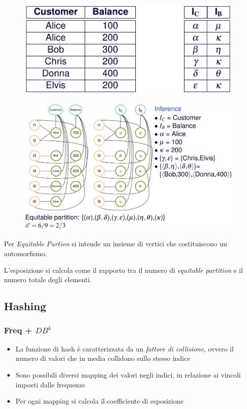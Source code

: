\documentclass{report}
\begin{document}
\begin{figure}[ht]
    \centering
    \includegraphics[width=0.7\linewidth]{images/encryption/direct-db-dbk1.png}
\end{figure}
\begin{figure}[ht]
    \centering
    \includegraphics[width=1\linewidth]{images/encryption/direct-db-dbk2.png}
\end{figure}

\newpage
Per \textit{Equitable Partion} si intende un insieme di vertici che costituiscono un automorfismo.

\noindent L'esposizione si calcola come il rapporto tra il numero di \textit{equitable partition} e il numero totale degli elementi.

\newpage
\subsection{Hashing}
\subsubsection{Freq + $DB^k$}
\begin{itemize}
    \item La funzione di hash è caratterizzata da un \textit{fattore di collisione}, ovvero il numero 
    di valori che in media collidono sullo stesso indice 
    \item Sono possibili diversi mapping dei valori negli indici, in relazione ai vincoli imposti dalle frequenze 
    \item Per ogni mapping si calcola il coefficiente di esposizione
\end{itemize}
\end{document}
